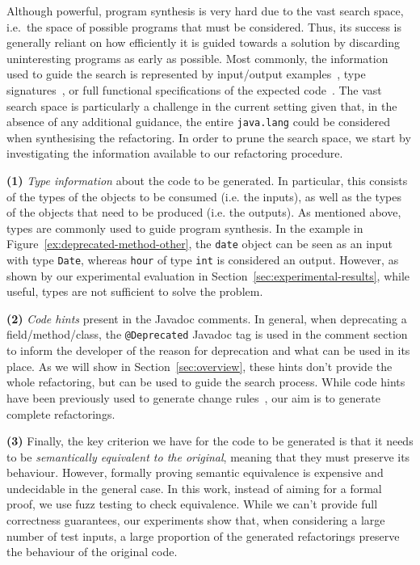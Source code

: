 Although powerful, program synthesis is very hard due to the vast search space, i.e.~the space of possible programs that must be considered. Thus, its success is generally reliant on how efficiently it is guided towards a solution by discarding uninteresting programs as early as possible. Most commonly, the information used to guide the search is represented by input/output examples~\cite{DBLP:conf/pldi/FeserCD15}, type signatures~\cite{DBLP:conf/pldi/OseraZ15}, or full functional specifications of the expected code~\cite{DBLP:conf/ijcai/MannaW79}.
%
The vast search space is particularly a challenge in the current
setting given that, in the absence of any additional guidance, the
entire \texttt{java.lang} could be considered when synthesising the
refactoring.  In order to prune the search space, we start by
investigating the information available to our refactoring procedure.


{\bf (1)} {\em Type information} about the code to be generated. In particular, this consists of the types of the objects to be consumed (i.e. the inputs), as well as the types of the objects that need to be produced (i.e. the outputs). As mentioned above, types are commonly used to guide  program synthesis. In the example in Figure~\ref{ex:deprecated-method-other}, the \texttt{date} object can be seen as an input with type \texttt{Date}, whereas \texttt{hour} of type \texttt{int} is considered an output.
However, as shown by our experimental evaluation in Section~\ref{sec:experimental-results}, while useful, types are not sufficient to solve the problem. 

{\bf (2)} {\em Code hints} present in the Javadoc comments. In general, when deprecating a field/method/class, the \texttt{@Deprecated} Javadoc tag is used in the
  comment section to inform the developer of the reason for deprecation and what can be used in its place. As we will show in Section~\ref{sec:overview}, these hints
  don't provide the whole refactoring, but can be used to guide the search process.
While code hints have been previously used to generate change rules~\cite{DBLP:conf/kbse/Huang0PW021}, our aim is to generate complete refactorings.
  
  {\bf (3)} Finally, the key criterion we have for the code to be generated is that it needs to be {\em semantically equivalent to the original}, meaning that they must preserve its behaviour. 
  However, formally proving semantic equivalence is expensive and undecidable in the general case. %
In this work, instead of aiming for a formal proof,  we use fuzz testing to check equivalence. %
While we can't provide full correctness guarantees,
our experiments show that, when considering a large number of test inputs, a large proportion of the generated refactorings preserve the behaviour of the original code.


